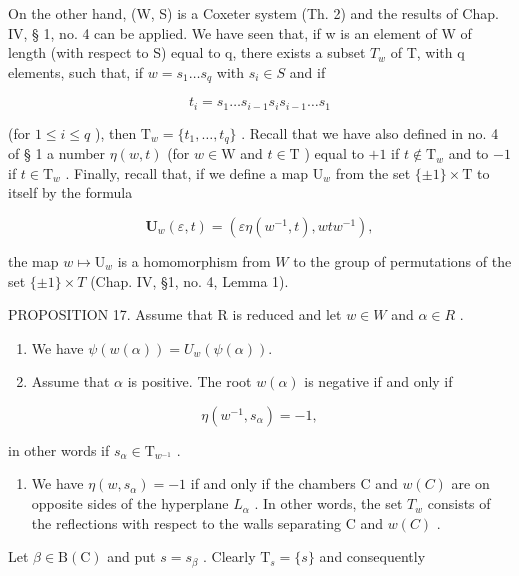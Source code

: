 On the other hand, (W, S) is a Coxeter system (Th. 2) and the results of Chap. IV, § 1, no. 4 can be applied. We have seen that, if w is an element of W of length (with respect to S) equal to q, there exists a subset \(T_{w}\) of T, with q elements, such that, if \(w = s_{1} \ldots s_{q}\) with \(s_{i} \in S\) and if

\[
t _ {i} = s _ {1} \dots s _ {i - 1} s _ {i} s _ {i - 1} \dots s _ {1}
\]

(for \(1 \leqslant i \leqslant q\) ), then \(\mathrm{T}_w = \{t_1, \ldots, t_q\}\) . Recall that we have also defined in no. 4 of § 1 a number \(\eta(w, t)\) (for \(w \in \mathrm{W}\) and \(t \in \mathrm{T}\) ) equal to \(+1\) if \(t \notin \mathrm{T}_w\) and to \(-1\) if \(t \in \mathrm{T}_w\) . Finally, recall that, if we define a map \(\mathrm{U}_w\) from the set \(\{\pm 1\} \times \mathrm{T}\) to itself by the formula

\[
\mathbf {U} _ {w} (\varepsilon , t) = (\varepsilon \eta (w ^ {- 1}, t), w t w ^ {- 1}),
\]

the map \(w \mapsto \mathrm{U}_w\) is a homomorphism from \(W\) to the group of permutations of the set \(\{\pm 1\} \times T\) (Chap. IV, §1, no. 4, Lemma 1).

PROPOSITION 17. Assume that R is reduced and let \(w \in W\) and \(\alpha \in R\) .

\begin{enumerate}
\def\labelenumi{(\roman{enumi})}
\item
  We have \(\psi(w(\alpha)) = U_w(\psi(\alpha)).\)
\item
  Assume that \(\alpha\) is positive. The root \(w(\alpha)\) is negative if and only if
\end{enumerate}

\[
\eta (w ^ {- 1}, s _ {\alpha}) = - 1,
\]

in other words if \(s_{\alpha} \in \mathrm{T}_{w^{-1}}\) .

\begin{enumerate}
\def\labelenumi{(\roman{enumi})}
\setcounter{enumi}{2}
\tightlist
\item
  We have \(\eta(w,s_{\alpha})=-1\) if and only if the chambers C and \(w(C)\) are on opposite sides of the hyperplane \(L_{\alpha}\) . In other words, the set \(T_{w}\) consists of the reflections with respect to the walls separating C and \(w(C)\) .
\end{enumerate}

Let \(\beta \in \mathrm{B}(\mathrm{C})\) and put \(s = s_{\beta}\) . Clearly \(\mathrm{T}_s = \{s\}\) and consequently


